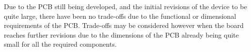	Due to the PCB still being developed, and the initial revisions of the device to be quite large, there have been no trade-offs due to the functional or dimensional requirements of the PCB. Trade-offs may be considered however when the board reaches further revisions due to the dimensions of the PCB already being quite small for all the required components. 








